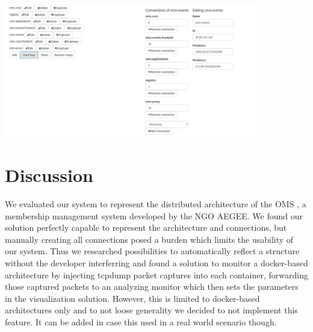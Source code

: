 \documentclass[]{paper}
\begin{document}
\includegraphics[width=11cm]{screenshot2.png}

\section{Discussion}

We evaluated our system to represent the distributed architecture of the OMS \cite{OMS}, a membership management system developed by the NGO AEGEE. We found our solution perfectly capable to represent the architecture and connections, but manually creating all connections posed a burden which limits the usability of our system. Thus we researched possibilities to automatically reflect a structure without the developer interferring and found a solution to monitor a docker-based architecture by injecting tcpdump packet captures into each container, forwarding those captured packets to an analyzing monitor which then sets the parameters in the visualization solution. However, this is limited to docker-based architectures only and to not loose generality we decided to not implement this feature. It can be added in case this used in a real world scenario though.



\end{document}
